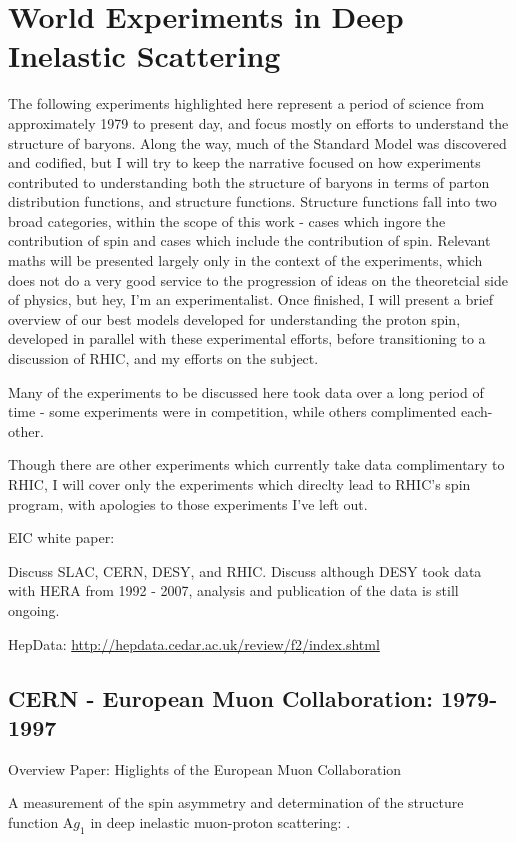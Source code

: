 \clearpage
\section{World Experiments in Deep Inelastic Scattering}

The following experiments highlighted here represent a period of science from
approximately 1979 to present day, and focus mostly on efforts to understand the
structure of baryons. Along the way, much of the Standard Model was discovered
and codified, but I will try to keep the narrative focused on how experiments
contributed to understanding both the structure of baryons in terms of parton
distribution functions, and structure functions. Structure functions fall into
two broad categories, within the scope of this work - cases which ingore the
contribution of spin and cases which include the contribution of spin. Relevant
maths will be presented largely only in the context of the experiments, which
does not do a very good service to the progression of ideas on the theoretcial
side of physics, but hey, I'm an experimentalist. Once finished, I will present
a brief overview of our best models developed for understanding the proton spin,
developed in parallel with these experimental efforts, before transitioning to a
discussion of RHIC, and my efforts on the subject.

Many of the experiments to be discussed here took data over a long period of
time - some experiments were in competition, while others complimented
each-other.

Though there are other experiments which currently take data complimentary to
RHIC, I will cover only the experiments which direclty lead to RHIC's spin
program, with apologies to those experiments I've left out. 

EIC white paper: ~\cite{Accardi2012}

Discuss SLAC, CERN, DESY, and RHIC. Discuss although DESY took data with HERA
from 1992 - 2007, analysis and publication of the data is still ongoing.

HepData: \url{http://hepdata.cedar.ac.uk/review/f2/index.shtml}


\subsection{CERN - European Muon Collaboration: 1979-1997}
Overview Paper: Higlights of the European Muon Collaboration
~\cite{Kullander1990a}

A measurement of the spin asymmetry and determination of the structure function
A$g_1$ in deep inelastic muon-proton scattering: \cite{Ashman1988}.

